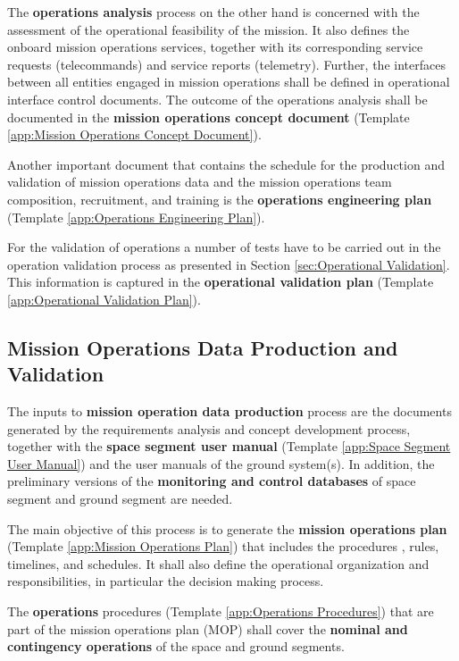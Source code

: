 The \textbf{operations analysis} process on the other hand is concerned with the assessment of the operational feasibility of the mission. It also defines the onboard mission operations services, together with its corresponding service requests (telecommands) and service reports (telemetry). Further, the interfaces between all entities engaged in mission operations shall be defined in operational interface control documents. The outcome of the operations analysis shall be documented in the \textbf{mission operations concept document} (Template \ref{app:Mission Operations Concept Document}).

Another important document that contains the schedule for the production and validation of mission operations data and the mission operations team composition, recruitment, and training is the \textbf{operations engineering plan} (Template \ref{app:Operations Engineering Plan}).

For the validation of operations a number of tests have to be carried out in the operation validation process as presented in Section \ref{sec:Operational Validation}. This information is captured in the \textbf{operational validation plan} (Template \ref{app:Operational Validation Plan}).

\subsection{Mission Operations Data Production and Validation}

The inputs to \textbf{mission operation data production} process are the documents generated by the requirements analysis and concept development process, together with the \textbf{space segment user manual} (Template \ref{app:Space Segment User Manual}) and the user manuals of the ground system(s). In addition, the preliminary versions of the \textbf{monitoring and control databases} of space segment and ground segment are needed.

The main objective of this process is to generate the \textbf{mission operations plan} (Template \ref{app:Mission Operations Plan}) that includes the procedures , rules, timelines, and schedules. It shall also define the operational organization and responsibilities, in particular the decision making process.

The \textbf{operations} procedures (Template \ref{app:Operations Procedures}) that are part of the mission operations plan (MOP) shall cover the \textbf{nominal and contingency operations} of the space and ground segments.

